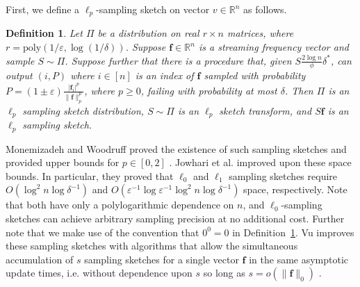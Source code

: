 \documentclass{report}
\newtheorem{definition}{Definition}[section]
\newcommand{\algoname}[1]{\textnormal{\textsc{#1}}}
\newcommand{\poly}{\mathrm{poly}}
\begin{document}
First, we define a $\ell_p$-sampling sketch on vector $v \in \mathbb{R}^n$ as follows.
%
\begin{definition} \label{def:lp-sample}
Let $\Pi$ be a distribution on real $r \times n$ matrices, where $r = \poly(1/\varepsilon, \log(1/\delta))$. 
Suppose $\mathbf{f} \in \mathbb{R}^n$ is a streaming frequency vector and sample $S \sim \Pi$. 
Suppose further that there is a procedure that, given $S\frac{2\log n}{\phi}\delta^*$, can output $(i,P)$ where $i \in [n]$ is an index of $\mathbf{f}$ sampled with probability $P = (1 \pm \varepsilon)\frac{|\mathbf{f}_i|^p}{\|\mathbf{f}\|^p_p}$, where $p \geq 0$, failing with probability at most $\delta$. 
Then $\Pi$ is an $\ell_p$ sampling sketch distribution, $S \sim \Pi$ is an $\ell_p$ sketch transform, and $S\mathbf{f}$ is an $\ell_p$ sampling sketch.
\end{definition}
%

Monemizadeh and Woodruff proved the existence of such sampling sketches and provided upper bounds for $p \in [0,2]$ \cite{monemizadeh20101}.
Jowhari et al. \cite{jowhari2011tight} improved upon these space bounds.
In particular, they proved that $\ell_0$ and $\ell_1$ sampling sketches require $O(\log^2 n \log \delta^{-1})$ and $O(\varepsilon^{-1} \log \varepsilon^{-1} \log^2 n \log \delta^{-1})$ space, respectively.
Note that both have only a polylogarithmic dependence on $n$, and $\ell_0$-sampling sketches can achieve arbitrary sampling precision at no additional cost. 
Further note that we make use of the convention that $0^0 = 0$ in Definition~\ref{def:lp-sample}.
Vu improves these sampling sketches with algorithms that allow the simultaneous accumulation of $s$ sampling sketches for a single vector $\mathbf{f}$ in the same asymptotic update times, i.e. without dependence upon $s$ so long as $s = o(\|\mathbf{f}\|_0)$ \cite{vu2018data}.
\end{document}
